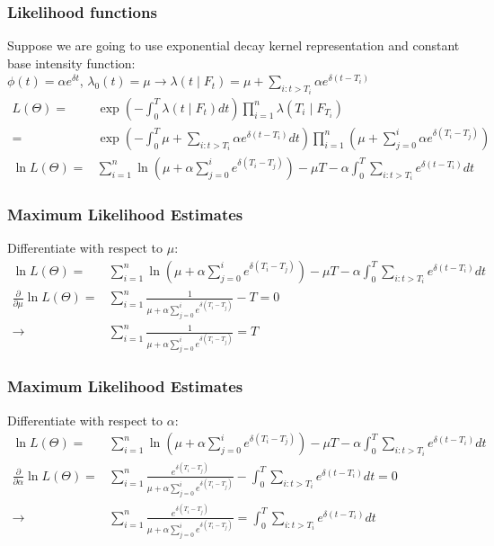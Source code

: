 \documentclass{beamer}
\begin{document}
\begin{frame}
\frametitle{Likelihood functions}
Suppose we are going to use exponential decay kernel representation and constant base intensity function:\\
$\phi(t) = \alpha e^{\delta t}$, $\lambda_0(t) = \mu \to \lambda(t \mid F_{t}) = \mu + \sum_{i: t>T_i} \alpha e^{\delta (t - T_{i})}$
\begin{equation*}
\begin{split}
L(\Theta) = &\exp(-\int_{0}^{T} \lambda(t \mid F_t) dt) \prod_{i=1}^n \lambda(T_i \mid F_{T_{i}})\\
= &\exp(-\int_{0}^{T}  \mu + \sum_{i: t>T_i} \alpha e^{\delta (t - T_i)} dt) \prod_{i=1}^n (\mu + \sum_{j=0}^i \alpha e^{\delta (T_i - T_j)})\\[5mm]
\ln L(\Theta) = & \sum_{i=1}^n \ln (\mu + \alpha \sum_{j=0}^i  e^{\delta (T_i - T_j)}) - \mu T - \alpha \int_{0}^{T}  \sum_{i: t>T_i} e^{\delta (t - T_i)} dt 
\end{split}
\end{equation*}
\end{frame}

\begin{frame}
\frametitle{Maximum Likelihood Estimates}
Differentiate with respect to $\mu$:
\begin{equation*}
\begin{split}
\ln L(\Theta) = & \sum_{i=1}^n \ln (\mu + \alpha \sum_{j=0}^i  e^{\delta (T_i - T_j)}) - \mu T - \alpha \int_{0}^{T}  \sum_{i: t>T_i} e^{\delta (t - T_i)} dt \\
\frac{\partial}{\partial \mu} \ln L(\Theta) =& \sum_{i=1}^n \frac{1}{\mu + \alpha \sum_{j=0}^i e^{\delta (T_i - T_j)}} - T = 0\\
\to &\sum_{i=1}^n \frac{1}{\mu + \alpha \sum_{j=0}^i e^{\delta (T_i - T_j)}} = T
\end{split}
\end{equation*}
\end{frame}

\begin{frame}
\frametitle{Maximum Likelihood Estimates}
Differentiate with respect to $\alpha$:
\begin{equation*}
\begin{split}
\ln L(\Theta) = & \sum_{i=1}^n \ln (\mu + \alpha \sum_{j=0}^i  e^{\delta (T_i - T_j)}) - \mu T - \alpha \int_{0}^{T}  \sum_{i: t>T_i} e^{\delta (t - T_i)} dt \\
\frac{\partial}{\partial \alpha} \ln L(\Theta) =& \sum_{i=1}^n \frac{e^{\delta (T_i - T_j)}}{\mu + \alpha \sum_{j=0}^i e^{\delta (T_i - T_j)}} - \int_{0}^{T}  \sum_{i: t>T_i} e^{\delta (t - T_i)} dt= 0\\
\to& \sum_{i=1}^n \frac{e^{\delta (T_i - T_j)}}{\mu + \alpha \sum_{j=0}^i e^{\delta (T_i - T_j)}} = \int_{0}^{T}  \sum_{i: t>T_i} e^{\delta (t - T_i)} dt
\end{split}
\end{equation*}
\end{frame}
\end{document}
